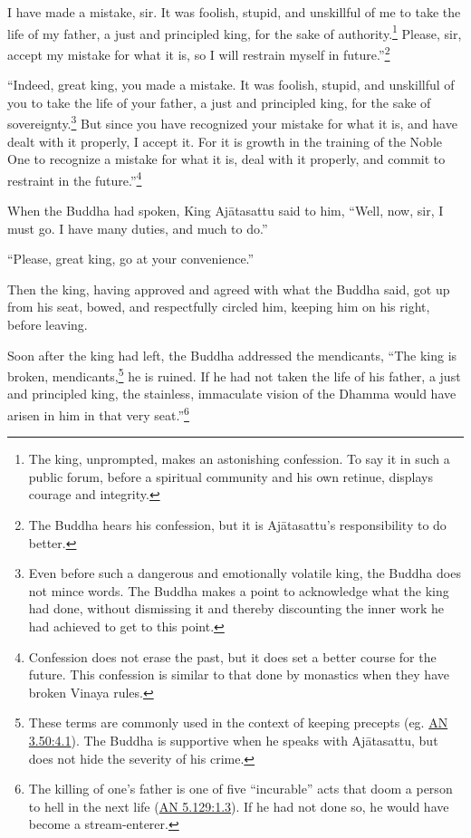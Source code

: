 \documentclass[12pt,openany]{book}%
\begin{document}
I have made a mistake, sir. It was foolish, stupid, and unskillful of me to take the life of my father, a just and principled king, for the sake of authority.\footnote{The king, unprompted, makes an astonishing confession. To say it in such a public forum, before a spiritual community and his own retinue, displays courage and integrity. } Please, sir, accept my mistake for what it is, so I will restrain myself in future.”\footnote{The Buddha hears his confession, but it is \textsanskrit{Ajātasattu}’s responsibility to do better. } 

“Indeed, great king, you made a mistake. It was foolish, stupid, and unskillful of you to take the life of your father, a just and principled king, for the sake of sovereignty.\footnote{Even before such a dangerous and emotionally volatile king, the Buddha does not mince words. The Buddha makes a point to acknowledge what the king had done, without dismissing it and thereby discounting the inner work he had achieved to get to this point. } But since you have recognized your mistake for what it is, and have dealt with it properly, I accept it. For it is growth in the training of the Noble One to recognize a mistake for what it is, deal with it properly, and commit to restraint in the future.”\footnote{Confession does not erase the past, but it does set a better course for the future. This confession is similar to that done by monastics when they have broken Vinaya rules. } 

When the Buddha had spoken, King \textsanskrit{Ajātasattu} said to him, “Well, now, sir, I must go. I have many duties, and much to do.” 

“Please, great king, go at your convenience.” 

Then the king, having approved and agreed with what the Buddha said, got up from his seat, bowed, and respectfully circled him, keeping him on his right, before leaving. 

Soon after the king had left, the Buddha addressed the mendicants, “The king is broken, mendicants,\footnote{These terms are commonly used in the context of keeping precepts (eg. \href{https://suttacentral.net/an3.50/en/sujato\#4.1}{AN 3.50:4.1}). The Buddha is supportive when he speaks with \textsanskrit{Ajātasattu}, but does not hide the severity of his crime. } he is ruined. If he had not taken the life of his father, a just and principled king, the stainless, immaculate vision of the Dhamma would have arisen in him in that very seat.”\footnote{The killing of one’s father is one of five “incurable” acts that doom a person to hell in the next life (\href{https://suttacentral.net/an5.129/en/sujato\#1.3}{AN 5.129:1.3}). If he had not done so, he would have become a stream-enterer. } 
\end{document}
